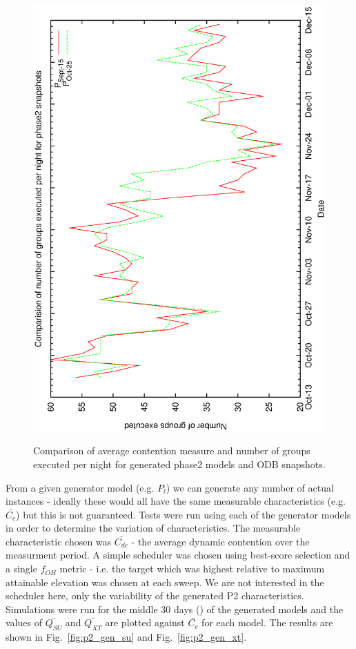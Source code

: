 \begin{figure}[h]
\begin{center}
{   \includegraphics[scale=0.25, angle=-90]{figures/c60_odb_ng.eps}
  }
\caption{Comparison of average contention measure and number of groups executed per night for generated phase2 models and ODB snapshots.}
 \end{center}
\end{figure}

From a given generator model (e.g. $P_l$) we can generate any number of actual instances - ideally these would all have the same measurable characteristics (e.g. $\bar{C_c}$) but this is not guaranteed. Tests were run using each of the generator models in order to determine the variation of characteristics. The measurable characteristic chosen was $\bar{C_{dc}}$ - the average dynamic contention over the measurment period. A simple scheduler was chosen using best-score selection and a single $f_{OH}$ metric - i.e. the target which was highest relative to maximum attainable elevation was chosen at each sweep. We are not interested in the scheduler here, only the variability of the generated  P2 characteristics. Simulations were run for the middle 30 days () of the generated models and the values of $\bar{Q_{SU}}$ and $\bar{Q_{XT}}$ are plotted against $\bar{C_c}$ for each model. The results are shown in Fig.~\ref{fig:p2_gen_su} and  Fig.~\ref{fig:p2_gen_xt}.


